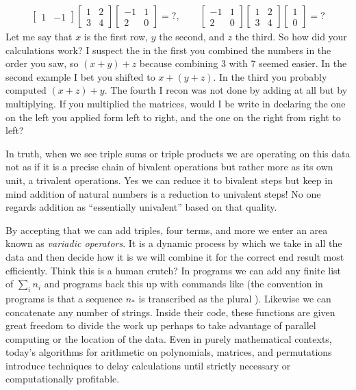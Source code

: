 \begin{align*}
    \begin{bmatrix}
        1 & -1 
    \end{bmatrix}
    \begin{bmatrix}
        1 & 2 \\ 3 & 4 
    \end{bmatrix}
    \begin{bmatrix}
        -1 & 1 \\
        2 & 0
    \end{bmatrix}=?,
    \qquad
    \begin{bmatrix}
        -1 & 1 \\
        2 & 0
    \end{bmatrix}
    \begin{bmatrix}
        1 & 2 \\ 3 & 4 
    \end{bmatrix}
    \begin{bmatrix}
        1 \\ 0 
    \end{bmatrix}=?
\end{align*}
Let me say that $x$ is the first row, 
$y$ the second, and $z$ the third.  So how did your calculations 
work?  I suspect the in the first you combined the numbers in the 
order you saw, so $(x+y)+z$ because combining 3 with 7 seemed easier.
In the second example I bet you shifted to $x+(y+z)$.  In the third 
you probably computed $(x+z)+y$.  The fourth I recon was not done by 
adding at all but by multiplying.  If you multiplied the matrices,
would I be write in declaring the one on the left you applied form left
to right, and the one on the right from right to left?

In truth, when we see triple sums or triple products we are operating 
on this data not as if it is a precise chain of bivalent operations but 
rather more as its own unit, a trivalent operations.  Yes we can reduce 
it to bivalent steps but keep in mind addition of natural numbers is a reduction 
to univalent steps!  No one regards addition as ``essentially univalent'' based on 
that quality.

By accepting that we can add triples, four terms, and more we enter 
an area known as \emph{variadic operators}.  It is a dynamic process
by which we take in all the data and then decide how it is we will combine it
for the correct end result most efficiently.   Think this is a human crutch?
In programs we can add any finite list of $\sum_{i} n_i$ and 
programs back this up with commands like  
(the convention in programs is that a sequence $n_*$ is transcribed as 
the plural ).  Likewise we can concatenate any 
number of strings.  Inside their code, these functions are given great freedom 
to divide the work up perhaps to take advantage of parallel computing 
or the location of the data.  Even in purely mathematical contexts,
today's algorithms for arithmetic on polynomials, matrices, and 
permutations introduce techniques to delay calculations until strictly 
necessary or computationally profitable. 

